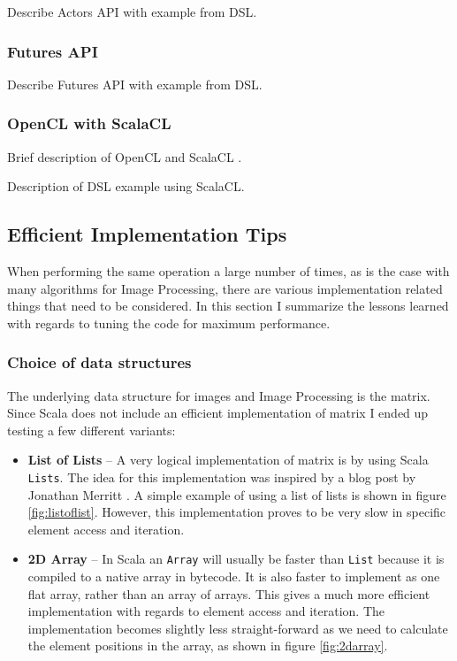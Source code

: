 \documentclass[a4paper,english]{report}
\begin{document}
Describe Actors API with example from DSL.

\subsubsection{Futures API}
\label{sec:futures}

Describe Futures API with example from DSL.

\subsubsection{OpenCL with ScalaCL}
\label{sec:opencl}

Brief description of OpenCL \cite{opencl} and ScalaCL \cite{scalacl}.

Description of DSL example using ScalaCL.

\subsection{Efficient Implementation Tips}
\label{sec:effimpl}

When performing the same operation a large number of times, as is the
case with many algorithms for Image Processing, there are various
implementation related things that need to be considered. In this
section I summarize the lessons learned with regards to tuning the
code for maximum performance.

\subsubsection{Choice of data structures}
\label{sec:datastructures}

The underlying data structure for images and Image Processing is the
matrix. Since Scala does not include an efficient implementation of
matrix I ended up testing a few different variants:

\begin{itemize}
\item \textbf{List of Lists} -- A very logical implementation of
  matrix is by using Scala \texttt{Lists}. The idea for this
  implementation was inspired by a blog post by Jonathan Merritt
  \cite{mer08}. A simple example of using a list of lists is shown in
  figure \vref{fig:listoflist}. However, this implementation proves to
  be very slow in specific element access and iteration.
\item \textbf{2D Array} -- In Scala an \texttt{Array} will usually be
  faster than \texttt{List} because it is compiled to a native array
  in bytecode. It is also faster to implement as one flat array,
  rather than an array of arrays. This gives a much more efficient
  implementation with regards to element access and iteration. The
  implementation becomes slightly less straight-forward as we need to
  calculate the element positions in the array, as shown in figure
  \vref{fig:2darray}.
\end{itemize}
\end{document}

